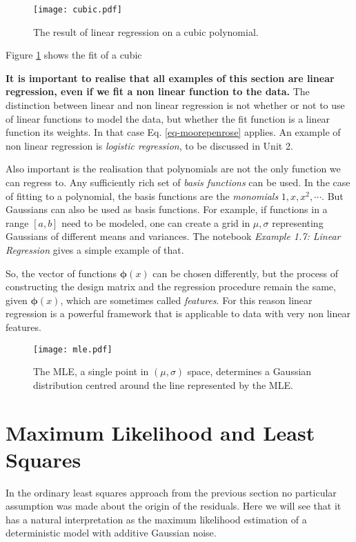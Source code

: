 \begin{figure}
\begin{center}
\texttt{[image: cubic.pdf]}
\end{center}
\caption{The result of linear regression on a cubic polynomial.}
\label{fig-cubic}
\end{figure}

Figure \ref{fig-cubic} shows the fit of a cubic
  
{\bf It is important to realise that all examples of this section are linear regression, even if we fit a non linear function to the data.} The distinction between
  linear and non linear regression is not  whether or not to use of linear functions to model the
  data, but whether the fit function is a linear function its weights. In that case
  Eq. \ref{eq-moorepenrose} applies.
  An example of non linear regression is \emph{logistic regression}, to be discussed in
  Unit 2.

  
  Also important is the realisation that polynomials are not the only function
  we can regress to. Any sufficiently rich set of \emph{basis functions} can
  be used. In the case of fitting to a polynomial, the basis functions are
  the \emph{monomials} $1, x, x^2, \cdots$. But Gaussians can also be used as basis
  functions. For example, if functions in a range $[a,b]$ need to be modeled, one
  can create a grid in $\mu, \sigma$ representing Gaussians of different means
  and variances. The notebook \emph{Example 1.7: Linear Regression} gives a simple
  example of that.

  So, the vector of functions $\boldsymbol{\phi}(x)$ can be chosen differently,
  but the process of constructing the design matrix and the regression procedure remain
  the same, given $\boldsymbol{\phi}(x)$, which are sometimes called \emph{features}.
  For this reason linear regression is a powerful framework that is applicable to
  data with very non linear features. 


\begin{figure}[!ht]
\begin{center}
\texttt{[image: mle.pdf]}
\end{center}
\caption{The MLE, a single point in $(\mu, \sigma)$ space, determines a Gaussian distribution centred around the line represented by the MLE.}
\end{figure}  

  

  \section{Maximum Likelihood and Least Squares}
  In the ordinary least squares approach from the previous section no particular assumption was made about the origin of the residuals. Here we will see
  that it has a natural interpretation as the maximum likelihood estimation of a deterministic model with additive Gaussian noise.

